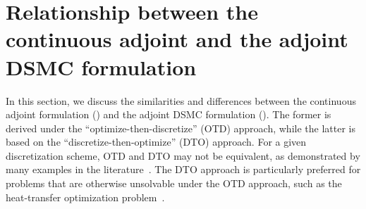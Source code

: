 \documentclass[times,final,nopreprintline]{elsarticle}
\newcommand{\blue}{}
\begin{document}









\section{Relationship between the continuous adjoint and the adjoint DSMC formulation}
\label{sec:discussion}
In this section, we discuss the similarities and differences between the continuous adjoint formulation () and the adjoint DSMC formulation (). The former is derived under the ``optimize-then-discretize'' (OTD) approach, while the latter is based on the ``discretize-then-optimize'' (DTO) approach. For a given discretization scheme, OTD and DTO may not be equivalent, as demonstrated by many examples in the literature~\cite{hager2000runge,burkardt2002insensitive,
abraham2004effect,hinze2012discretization,liu2019non}. The DTO approach is particularly preferred for problems that are otherwise unsolvable under the OTD approach, such as the heat-transfer optimization problem~\cite{betts2005discretize,ghobadi2009discretize}.
\end{document}
